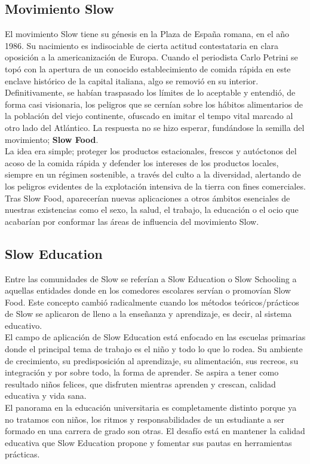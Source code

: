 \subsection{Movimiento Slow}
El movimiento Slow tiene su g\'enesis en la Plaza de Espa\~na romana, en el año 1986. Su nacimiento es indisociable de cierta actitud contestataria en clara 
oposici\'on a la americanizaci\'on de Europa. Cuando el periodista Carlo Petrini se top\'o con la apertura de un conocido establecimiento de comida r\'apida en 
este enclave hist\'orico de la capital italiana, algo se removi\'o en su interior. Definitivamente, se hab\'ian traspasado los l\'imites de lo aceptable y 
entendi\'o, de forma casi visionaria, los peligros que se cern\'ian sobre los h\'abitos alimentarios de la poblaci\'on del viejo continente, ofuscado en imitar 
el tempo vital marcado al otro lado del Atl\'antico. La respuesta no se hizo esperar, fund\'andose la semilla del movimiento; \textbf{Slow Food}.\\
La idea era simple; proteger los productos estacionales, frescos y aut\'octonos del acoso de la comida r\'apida y defender los intereses de los productos locales,
siempre en un r\'egimen sostenible, a trav\'es del culto a la diversidad, alertando de los peligros evidentes de la explotaci\'on intensiva de la tierra con 
fines comerciales.\\
Tras Slow Food, aparecer\'ian nuevas aplicaciones a otros \'ambitos esenciales de nuestras existencias como el sexo, la salud, el trabajo, la educación o el ocio
que acabar\'ian por conformar las \'areas de influencia del movimiento Slow. 


\subsection{Slow Education}
Entre las comunidades de Slow se refer\'ian a Slow Education o Slow Schooling a aquellas entidades donde en los comedores escolares serv\'ian o promov\'ian Slow Food.
Este concepto cambi\'o radicalmente cuando los m\'etodos te\'oricos/pr\'acticos de Slow se aplicaron de lleno a la ense\~nanza y aprendizaje, es decir, al sistema
educativo.\\
El campo de aplicaci\'on de Slow Education est\'a enfocado en las escuelas primarias donde el principal tema de trabajo es el ni\~no y todo lo que lo rodea. Su 
ambiente de crecimiento, su predisposici\'on al aprendizaje, su alimentaci\'on, sus recreos, su integraci\'on y por sobre todo, la forma de aprender. Se aspira 
a tener como resultado ni\~nos felices, que disfruten mientras aprenden y crescan, calidad educativa y vida sana.\\
El panorama en la educaci\'on universitaria es completamente distinto porque ya no tratamos con ni\~nos, los ritmos y responsabilidades de un estudiante a ser 
formado en una carrera de grado son otras. El desaf\'io est\'a en mantener la calidad educativa que Slow Education propone y fomentar sus pautas en herramientas
pr\'acticas.

